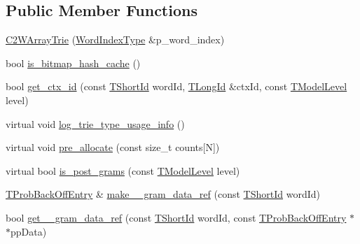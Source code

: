 \subsection*{Public Member Functions}
\begin{DoxyCompactItemize}
\item 
\hyperlink{classuva_1_1smt_1_1tries_1_1_c2_w_array_trie_a8dded156c8d6aa846966674badb7ab27}{C2\+W\+Array\+Trie} (\hyperlink{classuva_1_1smt_1_1tries_1_1_word_index_trie_base_a30c4fffe3a3423c87b229b66340dd2f8}{Word\+Index\+Type} \&p\+\_\+word\+\_\+index)
\item 
bool \hyperlink{classuva_1_1smt_1_1tries_1_1_c2_w_array_trie_a38e7ff66b6b632002797a2c3d6c8257e}{is\+\_\+bitmap\+\_\+hash\+\_\+cache} ()
\item 
bool \hyperlink{classuva_1_1smt_1_1tries_1_1_c2_w_array_trie_a4f59610fbdb7ddf1120742995ae42c06}{get\+\_\+ctx\+\_\+id} (const \hyperlink{namespaceuva_1_1smt_1_1hashing_adcf22e1982ad09d3a63494c006267469}{T\+Short\+Id} word\+Id, \hyperlink{namespaceuva_1_1smt_1_1hashing_a5992ac0dea0fb3226fb403ede09fad55}{T\+Long\+Id} \&ctx\+Id, const \hyperlink{namespaceuva_1_1smt_1_1tries_a20577a44b3a42d26524250634379b7cb}{T\+Model\+Level} level)
\item 
virtual void \hyperlink{classuva_1_1smt_1_1tries_1_1_c2_w_array_trie_a1fda8c151714ec6270b8a282b11ac4d0}{log\+\_\+trie\+\_\+type\+\_\+usage\+\_\+info} ()
\item 
virtual void \hyperlink{classuva_1_1smt_1_1tries_1_1_c2_w_array_trie_a3a4d5898745372360db575a4adef42f6}{pre\+\_\+allocate} (const size\+\_\+t counts\mbox{[}N\mbox{]})
\item 
virtual bool \hyperlink{classuva_1_1smt_1_1tries_1_1_c2_w_array_trie_a219720df242702e85002da19b07a8391}{is\+\_\+post\+\_\+grams} (const \hyperlink{namespaceuva_1_1smt_1_1tries_a20577a44b3a42d26524250634379b7cb}{T\+Model\+Level} level)
\item 
\hyperlink{structuva_1_1smt_1_1tries_1_1_t_prob_back_off_entry}{T\+Prob\+Back\+Off\+Entry} \& \hyperlink{classuva_1_1smt_1_1tries_1_1_c2_w_array_trie_aff302d55d0b43e57a03d2f9f9ba9b234}{make\+\_\+\_\+gram\+\_\+data\+\_\+ref} (const \hyperlink{namespaceuva_1_1smt_1_1hashing_adcf22e1982ad09d3a63494c006267469}{T\+Short\+Id} word\+Id)
\item 
bool \hyperlink{classuva_1_1smt_1_1tries_1_1_c2_w_array_trie_a219c5fced7a5344dddc5135a3a1499ec}{get\+\_\+\_\+gram\+\_\+data\+\_\+ref} (const \hyperlink{namespaceuva_1_1smt_1_1hashing_adcf22e1982ad09d3a63494c006267469}{T\+Short\+Id} word\+Id, const \hyperlink{structuva_1_1smt_1_1tries_1_1_t_prob_back_off_entry}{T\+Prob\+Back\+Off\+Entry} $\ast$$\ast$pp\+Data)
$$
\end{DoxyCompactItemize}
